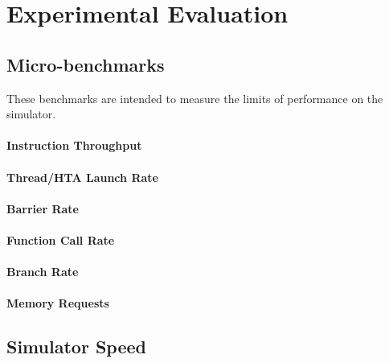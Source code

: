 \documentclass[conference, 10pt]{IEEEtran}
\begin{document}

\section{Experimental Evaluation}

\subsection{Micro-benchmarks}

These benchmarks are intended to measure the limits of performance on the
simulator.

\paragraph{Instruction Throughput}

\paragraph{Thread/HTA Launch Rate}

\paragraph{Barrier Rate}

\paragraph{Function Call Rate}

\paragraph{Branch Rate}

\paragraph{Memory Requests}

\subsection{Simulator Speed}
\end{document}
